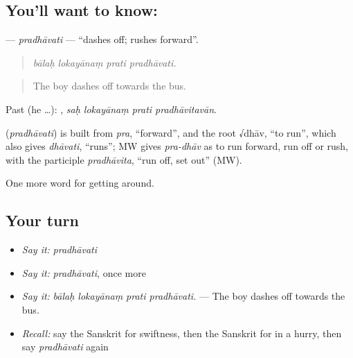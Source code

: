 \subsection*{You'll want to know: }
\textbf{} — \emph{pradhāvati} — \textquotedblleft{}dashes off; rushes forward\textquotedblright{}.

\begin{quote}
   
\end{quote}

\begin{quote}
\emph{bālaḥ lokayānaṃ prati pradhāvati.}
\end{quote}

\begin{quote}
The boy dashes off towards the bus.
\end{quote}

Past (he …):    , \emph{saḥ lokayānaṃ prati pradhāvitavān}.

\begin{cousinweb}
\textbf{} (\emph{pradhāvati}) is built from \emph{pra}, \textquotedblleft{}forward\textquotedblright{}, and the root √dhāv, \textquotedblleft{}to run\textquotedblright{}, which also gives \emph{dhāvati}, \textquotedblleft{}runs\textquotedblright{}; MW gives \emph{pra-dhāv} as to run forward, run off or rush, with the participle \emph{pradhāvita}, \textquotedblleft{}run off, set out\textquotedblright{} (MW).
\end{cousinweb}

\begin{grammarlens}[title={What you've built}]
One more word for getting around.
\end{grammarlens}

\subsection*{Your turn}
\begin{itemize}
\raggedright
  \item \emph{Say it:} \emph{pradhāvati}
  \item \emph{Say it:} \emph{pradhāvati}, once more
  \item \emph{Say it:} \emph{bālaḥ lokayānaṃ prati pradhāvati.} — The boy dashes off towards the bus.
  \item \emph{Recall:} say the Sanskrit for swiftness, then the Sanskrit for in a hurry, then say \emph{pradhāvati} again
\end{itemize}

